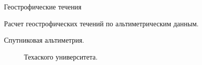 \begin{chapter}{Геострофические течения}
\begin{section}{Расчет геострофических течений по альтиметрическим данным.}
\begin{paragraph}{Спутниковая альтиметрия.}
\begin{figure}[t!]
{Техаского университета.}
\label{texas-may01}
\end{figure}
%
%
\end{paragraph}


\end{section}
\end{chapter}
